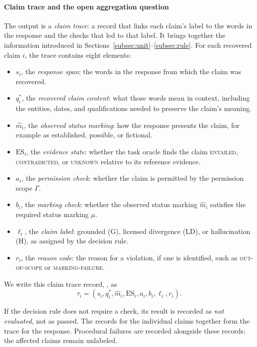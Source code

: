 \documentclass{clv2025}
\newcommand{\LD}{\textsc{LD}}
\newcommand{\Hall}{\textsc{H}}
\newcommand{\Grd}{\textsc{G}}
\begin{document}
\begin{samepage}
\paragraph{Claim trace and the open aggregation question}\label{subsec:response}

The output is a \emph{claim trace}: a record that links each claim's
label to the words in the response and the checks that led to that label.
It brings together the information introduced in
Sections~\ref{subsec:unit}--\ref{subsec:rule}. For each recovered claim $i$,
the trace contains eight elements:
\begin{itemize}
\item $s_i$, the \emph{response span}: the words in the response from which
the claim was recovered.
\item $q_i^*$, the \emph{recovered claim content}: what those words mean in
context, including the entities, dates, and qualifications needed to
preserve the claim's meaning.
\item $\widehat{m}_i$, the \emph{observed status marking}: how the response
presents the claim, for example as established, possible, or fictional.
\item $\mathrm{ES}_i$, the \emph{evidence state}: whether the task oracle
finds the claim \textsc{entailed}, \textsc{contradicted}, or \textsc{unknown}
relative to its reference evidence.
\item $a_i$, the \emph{permission check}: whether the claim is permitted
by the permission scope $\Gamma$.
\item $b_i$, the \emph{marking check}: whether the observed status marking
$\widehat{m}_i$ satisfies the required status marking $\mu$.
\item $\ell_i$, the \emph{claim label}: grounded (\Grd), licensed divergence
(\LD), or hallucination (\Hall), as assigned by the decision rule.
\item $r_i$, the \emph{reason code}: the reason for a violation, if one is
identified, such as \textsc{out-of-scope} or \textsc{marking-failure}.
\end{itemize}
We write this claim trace record, $$, as
\begin{equation}
\tau_i=(s_i,q_i^*,\widehat{m}_i,\mathrm{ES}_i,a_i,b_i,\ell_i,r_i).
\label{eq:claim-trace}
\end{equation}
\end{samepage}
If the decision rule does not require a check, its result is recorded as
\emph{not evaluated}, not as passed. The records for the individual claims
together form the trace for the response. Procedural failures are recorded
alongside these records; the affected claims remain unlabeled.
\end{document}
